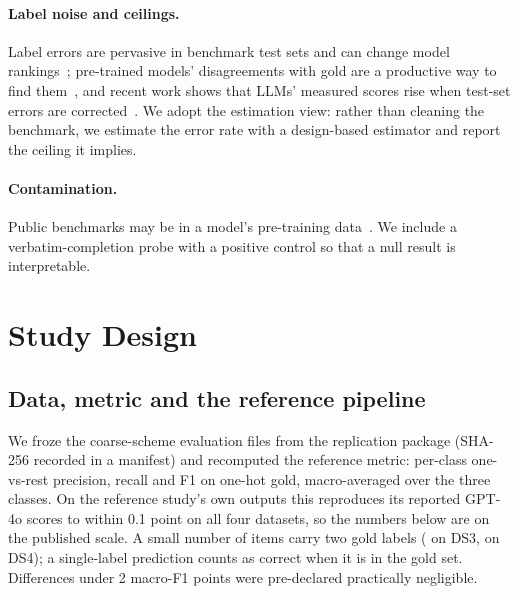 \documentclass[sigconf,anonymous,review]{acmart}
\newcommand{\fone}{macro-F1\xspace}
\begin{document}
\paragraph{Label noise and ceilings.} Label errors are pervasive in benchmark test sets and can change model rankings~\cite{northcutt2021}; pre-trained models' disagreements with gold are a productive way to find them~\cite{chong2022,klie2023}, and recent work shows that LLMs' measured scores rise when test-set errors are corrected~\cite{nahum2024}. We adopt the estimation view: rather than cleaning the benchmark, we estimate the error rate with a design-based estimator and report the ceiling it implies.

\paragraph{Contamination.} Public benchmarks may be in a model's pre-training data~\cite{sainz2023,golchin2024}. We include a verbatim-completion probe with a positive control so that a null result is interpretable.

\section{Study Design}

\subsection{Data, metric and the reference pipeline}
We froze the coarse-scheme evaluation files from the replication package (SHA-256 recorded in a manifest) and recomputed the reference metric: per-class one-vs-rest precision, recall and F1 on one-hot gold, macro-averaged over the three classes. On the reference study's own outputs this reproduces its reported GPT-4o scores to within 0.1 point on all four datasets, so the numbers below are on the published scale. A small number of items carry two gold labels (\multilabelDSthree{} on DS3, \multilabelDSfour{} on DS4); a single-label prediction counts as correct when it is in the gold set. Differences under 2 \fone points were pre-declared practically negligible.
\end{document}
